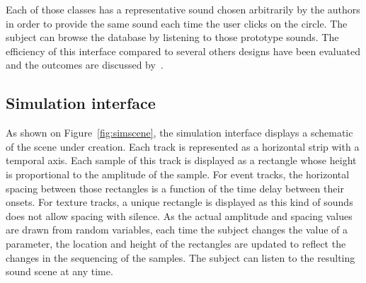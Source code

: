 \documentclass[12pt]{elsarticle}
\newcommand{\cf}{cf.}
\begin{document}
Each of those classes has a representative sound chosen arbitrarily by the authors in order to provide the same sound each time the user clicks on the circle. The subject can browse the database by listening to those prototype sounds. The efficiency of this interface compared to several others designs have been evaluated and the outcomes are discussed by~\cite{lafay2016JAES}.

\subsection{Simulation interface}


As shown on Figure~\ref{fig:simscene}, the simulation interface displays a schematic of the scene under creation. Each track is represented as a horizontal strip with a temporal axis. Each sample of this track is displayed as a rectangle whose height is proportional to the amplitude of the sample. For event tracks, the horizontal spacing between those rectangles is a function of the time delay between their onsets. For texture tracks, a unique rectangle is displayed as this kind of sounds does not allow spacing with silence. As the actual amplitude and spacing values are drawn from random variables, each time the subject changes the value of a parameter, the location and height of the rectangles are updated to reflect the changes in the sequencing of the samples. The subject can listen to the resulting sound scene at any time.

\end{document}
